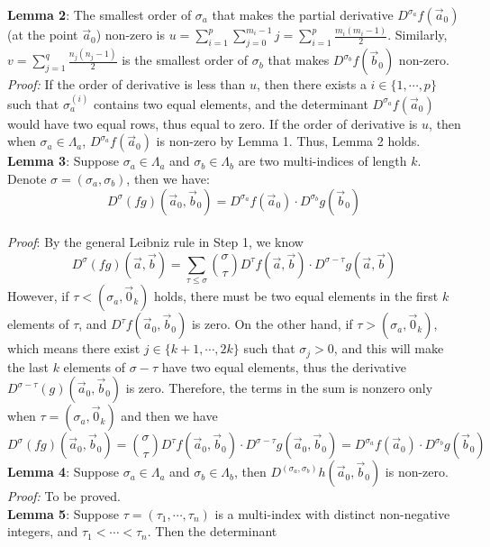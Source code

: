 \documentclass[12pt]{article}
\begin{document}
\textbf{Lemma 2}: The smallest order of $\sigma_{a}$ that makes the partial derivative $D^{\sigma_{a}}f(\vec{a}_{0})$(at the point $\vec{a}_{0}$) non-zero is $u=\sum_{i=1}^{p}\sum_{j=0}^{m_{i}-1}j=\sum_{i=1}^{p}\frac{m_{i}(m_{i}-1)}{2}$. Similarly, $v=\sum_{j=1}^{q}\frac{n_{j}(n_{j}-1)}{2}$ is the smallest order of $\sigma_{b}$ that makes $D^{\sigma_{b}}f(\vec{b}_{0})$ non-zero.\\
\emph{Proof:} If the order of derivative is less than $u$, then there exists a $i\in\{1,\cdots,p\}$ such that $\sigma_{a}^{(i)}$ contains two equal elements, and the determinant $D^{\sigma_{a}}f(\vec{a}_{0})$ would have two equal rows, thus equal to zero. If the order of derivative is $u$, then when $\sigma_{a}\in\Lambda_{a}$, $D^{\sigma_{a}}f(\vec{a}_{0})$ is non-zero by Lemma 1. Thus, Lemma 2 holds.\\
\textbf{Lemma 3}: Suppose $\sigma_{a}\in \Lambda_{a}$ and $\sigma_{b}\in \Lambda_{b}$ are two multi-indices of length $k$. Denote $\sigma=(\sigma_{a},\sigma_{b})$, then we have:
$$D^{\sigma}(fg)(\vec{a}_{0},\vec{b}_{0})=D^{\sigma_{a}}f(\vec{a}_{0})\cdot D^{\sigma_{b}}g(\vec{b}_{0})$$ \\
\emph{Proof}: By the general Leibniz rule in Step 1, we know $$D^{\sigma}(fg)(\vec{a},\vec{b})=\sum_{\tau\leqslant\sigma}\binom{\sigma}{\tau}D^{\tau}f(\vec{a},\vec{b})\cdot D^{\sigma-\tau}g(\vec{a},\vec{b})$$
However, if $\tau< (\sigma_{a},\vec{0}_{k})$ holds, there must be two equal elements in the first $k$ elements of $\tau$, and $D^{\tau}f(\vec{a}_{0},\vec{b}_{0})$ is zero. On the other hand, if $\tau> (\sigma_{a},\vec{0}_{k})$, which means there exist $j\in\{k+1,\cdots,2k\}$ such that $\sigma_{j}>0$, and this will make the last $k$ elements of $\sigma-\tau$ have two equal elements, thus the derivative $D^{\sigma-\tau}(g)(\vec{a}_{0},\vec{b}_{0})$ is zero. Therefore, the terms in the sum is nonzero only when $\tau=(\sigma_{a},\vec{0}_{k})$ and then we have $$D^{\sigma}(fg)(\vec{a}_{0},\vec{b}_{0})=\binom{\sigma}{\tau}D^{\tau}f(\vec{a}_{0},\vec{b}_{0})\cdot D^{\sigma-\tau}g(\vec{a}_{0},\vec{b}_{0})=D^{\sigma_{a}}f(\vec{a}_{0})\cdot D^{\sigma_{b}}g(\vec{b}_{0})$$
\textbf{Lemma 4}: Suppose $\sigma_{a}\in \Lambda_{a}$ and $\sigma_{b}\in \Lambda_{b}$, then $D^{(\sigma_{a},\sigma_{b})}h(\vec{a}_{0},\vec{b}_{0})$ is non-zero.\\
\emph{Proof:} To be proved.\\
\textbf{Lemma 5}: Suppose $\tau=(\tau_{1},\cdots,\tau_{n})$ is a multi-index with distinct non-negative integers, and $\tau_{1}<\cdots<\tau_{n}$. Then the determinant
\end{document}
